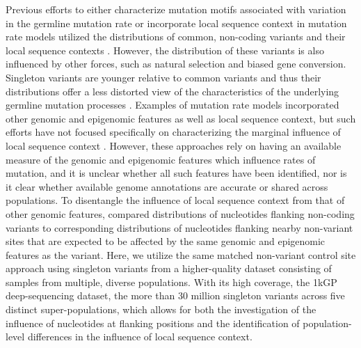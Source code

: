 Previous efforts to either characterize mutation motifs associated with variation in the germline mutation rate or incorporate local sequence context in mutation rate models utilized the distributions of common, non-coding variants and their local sequence contexts \citep{Aggarwala2016, Zhu2017}. However, the distribution of these variants is also influenced by other forces, such as natural selection and biased gene conversion.  Singleton variants are younger relative to common variants and thus their distributions offer a less distorted view of the characteristics of the underlying germline mutation processes \citep{Carlson2018}. Examples of mutation rate models incorporated other genomic and epigenomic features as well as local sequence context, but such efforts have not focused specifically on characterizing the marginal influence of local sequence context \citep{Aggarwala2016, Carlson2018}. However, these approaches rely on having an available measure of the genomic and epigenomic features which influence rates of mutation, and it is unclear whether all such features have been identified, nor is it clear whether available genome annotations are accurate or shared across populations. To disentangle the influence of local sequence context from that of other genomic features, \citep{Zhu2017} compared distributions of nucleotides flanking non-coding variants to corresponding distributions of nucleotides flanking nearby non-variant sites that are expected to be affected by the same genomic and epigenomic features as the variant. Here, we utilize the same matched non-variant control site approach using singleton variants from a higher-quality dataset consisting of samples from multiple, diverse populations. With its high coverage, the 1kGP deep-sequencing dataset, the more than 30 million singleton variants across five distinct super-populations, which allows for both the investigation of the influence of nucleotides at flanking positions and the identification of population-level differences in the influence of local sequence context. 

